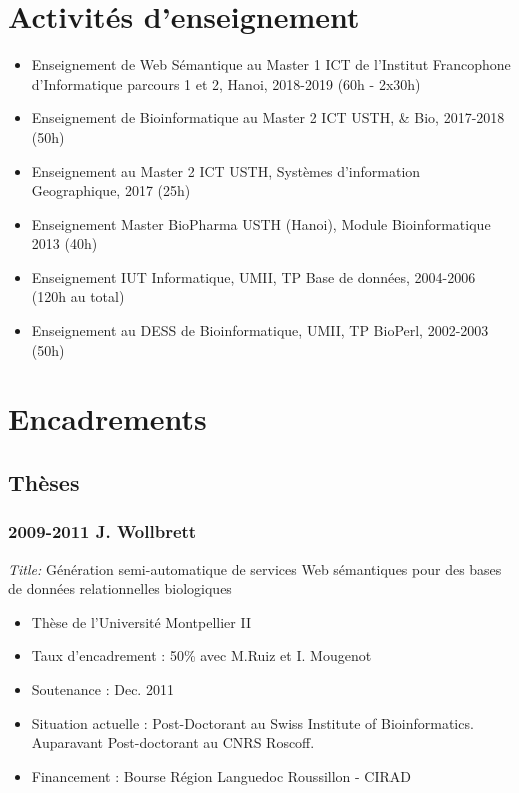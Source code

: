 \section{Activités d’enseignement}
\begin{itemize}
\item Enseignement de Web Sémantique au Master 1 ICT de l'Institut Francophone d'Informatique parcours 1 et 2, Hanoi, 2018-2019 (60h - 2x30h)
\item Enseignement de Bioinformatique au Master 2 ICT USTH, \& Bio, 2017-2018 (50h)
\item Enseignement au Master 2 ICT USTH, Systèmes d’information Geographique, 2017 (25h)
\item Enseignement Master BioPharma USTH (Hanoi), Module Bioinformatique 2013 (40h)
\item Enseignement IUT Informatique, UMII, TP Base de données, 2004-2006 (120h au total)
\item Enseignement au DESS de Bioinformatique, UMII, TP BioPerl, 2002-2003 (50h)

\end{itemize}


\section{Encadrements}

\subsection*{Thèses}

\subsubsection*{2009-2011 J. Wollbrett}
\textit{Title:} Génération semi-automatique de services Web sémantiques pour des bases de données relationnelles biologiques

\begin{itemize}
\item Thèse de l’Université Montpellier II
\item Taux d’encadrement : 50\% avec M.Ruiz et I. Mougenot
\item Soutenance : Dec. 2011
\item Situation actuelle : Post-Doctorant au Swiss Institute of Bioinformatics. Auparavant Post-doctorant au CNRS Roscoff.
\item Financement : Bourse Région Languedoc Roussillon - CIRAD

\end{itemize}


